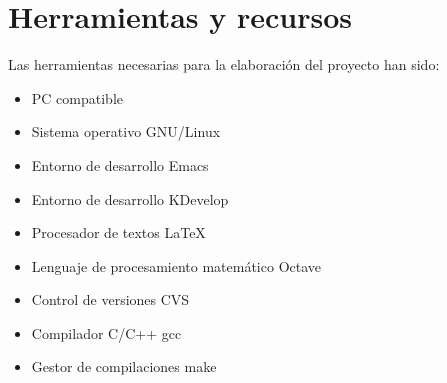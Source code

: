 %
%
%
% 
%
%
%
%

\chapter{Herramientas y recursos}
\label{cha:herr-y-recurs}

Las herramientas necesarias para la elaboración del proyecto han sido:

\begin{itemize}
\item PC compatible 
\item Sistema operativo GNU/Linux \cite{gnulinux}
\item Entorno de desarrollo Emacs \cite{emacs}
\item Entorno de desarrollo KDevelop \cite{kdevelop}
\item Procesador de textos \LaTeX \cite{lamport94}
\item Lenguaje de procesamiento matemático Octave  \cite{octave}
\item Control de versiones CVS \cite{cvs}
\item Compilador C/C++ gcc \cite{gcc}
\item Gestor de compilaciones make \cite{make}
\end{itemize}



